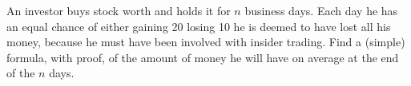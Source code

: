 An investor buys stock worth  and holds it for
$n$ business days. Each day he has an equal chance of either gaining 20%
losing 10%
he is deemed to have lost all his money, because he must have been involved
with insider trading. Find a (simple) formula, with proof, of the amount of
money he will have on average at the end of the $n$ days.
